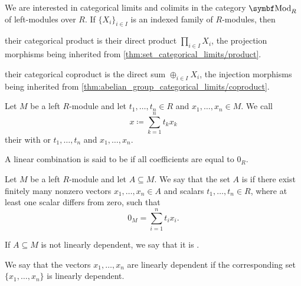 \begin{proposition}\label{thm:module_categorical_limits}
  We are interested in categorical limits and colimits in the category \( \Cat{Mod}_R \) of left-modules over \( R \). If \( \{ X_i \}_{i \in I} \) is an indexed family of \( R \)-modules, then
  \begin{defenum}
     their categorical product is their direct product \( \prod_{i \in I} X_i \), the projection morphisms being inherited from \cref{thm:set_categorical_limits/product}.

     their categorical coproduct is the direct sum \( \oplus_{i \in I} X_i \), the injection morphisms being inherited from \cref{thm:abelian_group_categorical_limits/coproduct}.
  \end{defenum}
\end{proposition}

\begin{definition}\label{def:linear_combination}
  Let \( M \) be a left \( R \)-module and let \( t_1, \ldots, t_n \in R \) and \( x_1, \ldots, x_n \in M \). We call
  \begin{equation*}
    x \coloneqq \sum_{k=1}^n t_k x_k
  \end{equation*}
  their  with  or  \( t_1, \ldots, t_n \) and  \( x_1, \ldots, x_n \).

  A linear combination is said to be  if all coefficients are equal to \( 0_R \).
\end{definition}

\begin{definition}\label{def:left_module_linear_dependence}
  Let \( M \) be a left \( R \)-module and let \( A \subseteq M \). We say that the set \( A \) is  if there exist finitely many nonzero vectors \( x_1, \ldots, x_n \in A \) and scalars \( t_1, \ldots, t_n \in R \), where at least one scalar differs from zero, such that
  \begin{equation*}
    0_M = \sum_{i=1}^n t_i x_i.
  \end{equation*}

  If \( A \subseteq M \) is not linearly dependent, we say that it is .

  We say that the vectors \( x_1, \ldots, x_n \) are linearly dependent if the corresponding set \( \{ x_1, \ldots, x_n \} \) is linearly dependent.
\end{definition}

